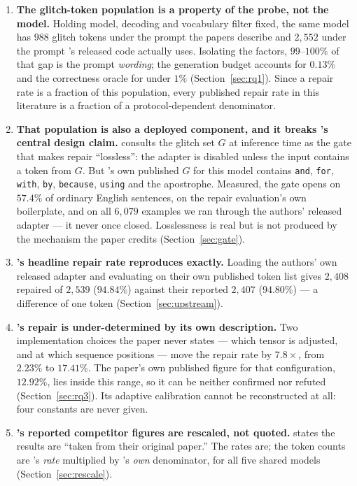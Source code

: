 \begin{enumerate}[leftmargin=*]

\item \textbf{The glitch-token population is a property of the probe, not the
model.} Holding model, decoding and vocabulary filter fixed, the same model has
$988$ glitch tokens under the prompt the papers describe and $2{,}552$ under the
prompt \gc{}'s released code actually uses. Isolating the factors, $99$--$100\%$
of that gap is the prompt \emph{wording}; the generation budget accounts for
$0.13\%$ and the correctness oracle for under $1\%$
(Section~\ref{sec:rq1}). Since a repair rate is a fraction of this population,
every published repair rate in this literature is a fraction of a
protocol-dependent denominator.

\item \textbf{That population is also a deployed component, and it breaks \gc{}'s
central design claim.} \gc{} consults the glitch set $G$ at inference time as the
gate that makes repair ``lossless'': the adapter is disabled unless the input
contains a token from $G$. But \gc{}'s own published $G$ for this model contains
\texttt{and}, \texttt{for}, \texttt{with}, \texttt{by}, \texttt{because},
\texttt{using} and the apostrophe. Measured, the gate opens on $57.4\%$ of
ordinary English sentences, on the repair evaluation's own boilerplate, and on
all $6{,}079$ examples we ran through the authors' released adapter --- it never
once closed. Losslessness is real but is not produced by the mechanism the paper
credits (Section~\ref{sec:gate}).

\item \textbf{\gc{}'s headline repair rate reproduces exactly.} Loading the
authors' own released adapter and evaluating on their own published token list
gives $2{,}408$ repaired of $2{,}539$ ($94.84\%$) against their reported $2{,}407$
($94.80\%$) --- a difference of one token (Section~\ref{sec:upstream}).

\item \textbf{\gp{}'s repair is under-determined by its own description.} Two
implementation choices the paper never states --- which tensor is adjusted, and
at which sequence positions --- move the repair rate by $7.8\times$, from
$2.23\%$ to $17.41\%$. The paper's own published figure for that configuration,
$12.92\%$, lies inside this range, so it can be neither confirmed nor refuted
(Section~\ref{sec:rq3}). Its adaptive calibration cannot be reconstructed at all:
four constants are never given.

\item \textbf{\gc{}'s reported competitor figures are rescaled, not quoted.}
\gc{} states the \gp{} results are ``taken from their original paper.'' The rates
are; the token counts are \gp{}'s \emph{rate} multiplied by \gc{}'s \emph{own}
denominator, for all five shared models (Section~\ref{sec:rescale}).

\end{enumerate}

